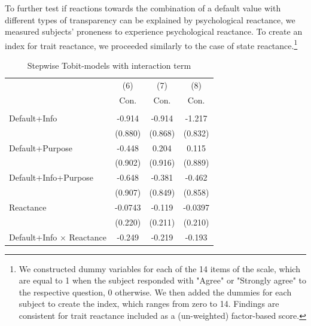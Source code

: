 \documentclass[review, authoryear,12pt]{elsarticle}
\begin{document}
To further test if reactions towards the combination of a default value with different types of transparency can be explained by psychological reactance, we measured subjects' proneness to experience psychological reactance. To create an index for trait reactance, we proceeded similarly to the case of state reactance.\footnote{We constructed dummy variables for each of the 14 items of the scale, which are equal to 1 when the subject responded with "Agree" or "Strongly agree" to the respective question, 0 otherwise. We then added the dummies for each subject to create the index, which ranges from zero to 14. Findings are consistent for trait reactance included as a (un-weighted) factor-based score.}

\begin{table}[htbp]\centering
\begin{adjustbox}{max width=\textwidth}
\def\sym#1{\ifmmode^{#1}\else\(^{#1}\)\fi}
\caption{Stepwise Tobit-models with interaction term \label{tab6}}
\begin{tabular}{l*{3}{c}}
\hline\hline
                    &\multicolumn{1}{c}{(6)}&\multicolumn{1}{c}{(7)}&\multicolumn{1}{c}{(8)}\\
                    &\multicolumn{1}{c}{Con.}&\multicolumn{1}{c}{Con.}&\multicolumn{1}{c}{Con.}\\
\hline
               &                     &                     &                     \\
Default+Info        &      -0.914         &      -0.914         &      -1.217         \\
                    &     (0.880)         &     (0.868)         &     (0.832)         \\
Default+Purpose     &      -0.448         &       0.204         &       0.115         \\
                    &     (0.902)         &     (0.916)         &     (0.889)         \\
Default+Info+Purpose&      -0.648         &      -0.381         &      -0.462         \\
                    &     (0.907)         &     (0.849)         &     (0.858)         \\
Reactance          &     -0.0743         &      -0.119         &     -0.0397         \\
                    &     (0.220)         &     (0.211)         &     (0.210)         \\
Default+Info $\times$ Reactance&      -0.249         &      -0.219         &      -0.193         \\

\end{tabular}
\end{adjustbox}
\end{table}
\end{document}
